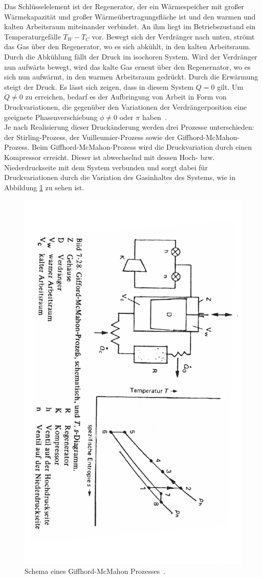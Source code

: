 \documentclass[parskip=half, a4paper,twoside,final]{article}
\begin{document}
Das Schlüsselelement ist der Regenerator, der ein Wärmespeicher mit großer Wärmekapazität und großer Wärmeübertragungsfläche ist und den warmen und kalten Arbeitsraum miteinander verbindet. An ihm liegt im Betriebszustand ein Temperaturgefälle $T_W - T_C$ vor. Bewegt sich der Verdränger nach unten, strömt das Gas über den Regenerator, wo es sich abkühlt, in den kalten Arbeitsraum. Durch die Abkühlung fällt der Druck im isochoren System. Wird der Verdränger nun aufwärts bewegt, wird das kalte Gas erneut über den Regenernator, wo es sich nun aufwärmt, in den warmen Arbeitsraum gedrückt. Durch die Erwärmung steigt der Druck. Es lässt sich zeigen, dass in diesem System $\dot{Q} = 0 $ gilt. Um $\dot{Q} \neq 0 $ zu erreichen, bedarf es der Aufbringung von Arbeit in Form von Druckvariationen, die gegenüber den Variationen der Verdrängerposition eine geeignete Phasenverschiebung $\phi \neq 0$ oder $\pi$ haben~\cite{Frey}. \\
Je nach Realisierung dieser Druckänderung werden drei Prozesse unterschieden: der Stirling-Prozess, der Vuilleumier-Prozess sowie der Giffhord-McMahon-Prozess. Beim Giffhord-McMa\-hon-Prozess wird die Druckvariation durch einen Kompressor erreicht. Dieser ist abwechselnd mit dessen Hoch- bzw. Niederdruckseite mit dem System verbunden und sorgt dabei für Druckvariationen durch die Variation des Gasinhaltes des Systems, wie in Abbildung \ref{fig:Giffhord-McMahon} zu sehen ist.

\begin{figure}[htp]
    \centering
        \includegraphics[height=0.9\textwidth, angle =90.7]{Bilder/McMahanMaschine.pdf}
    \caption{Schema eines Giffhord-McMahon Prozesses~\cite{Frey}.}
    \label{fig:Giffhord-McMahon}
\end{figure}
\end{document}
